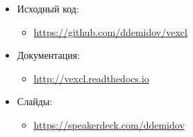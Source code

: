 \documentclass[@BEAMER_OPTIONS@]{beamer}
\newcommand{\www}[1]{\href{#1}{#1}}
\begin{document}
\begin{frame}{}
    \begin{itemize}
        \item Исходный код:
            \begin{itemize}
                \item \www{https://github.com/ddemidov/vexcl}
            \end{itemize}
            \vspace{\baselineskip}
        \item Документация:
            \begin{itemize}
                \item \www{http://vexcl.readthedocs.io}
            \end{itemize}
            \vspace{\baselineskip}
        \item Слайды:
            \begin{itemize}
                \item \www{https://speakerdeck.com/ddemidov}
            \end{itemize}
    \end{itemize}
\end{frame}
\end{document}
